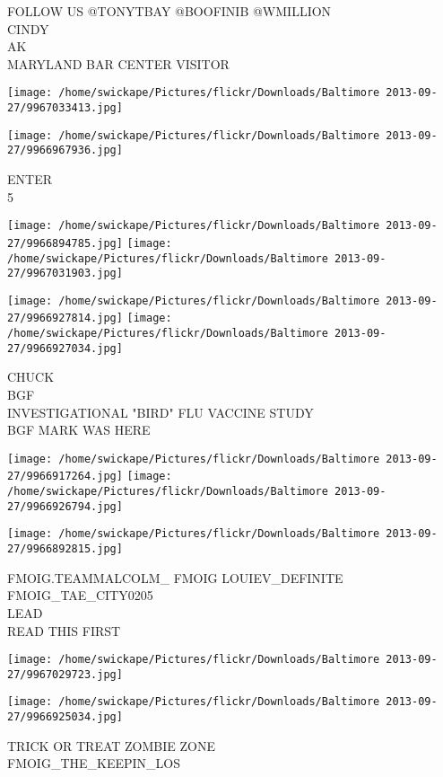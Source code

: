 \documentclass[10pt,letterpaper]{article}
\begin{document}
FOLLOW US @TONYTBAY @BOOFINIB @WMILLION\\
CINDY\\
AK\\
MARYLAND BAR CENTER VISITOR
\pagebreak

\texttt{[image: /home/swickape/Pictures/flickr/Downloads/Baltimore 2013-09-27/9967033413.jpg]}

\vspace{0.25in}
\texttt{[image: /home/swickape/Pictures/flickr/Downloads/Baltimore 2013-09-27/9966967936.jpg]}

ENTER\\
5
\pagebreak

\texttt{[image: /home/swickape/Pictures/flickr/Downloads/Baltimore 2013-09-27/9966894785.jpg]}
\texttt{[image: /home/swickape/Pictures/flickr/Downloads/Baltimore 2013-09-27/9967031903.jpg]}

\texttt{[image: /home/swickape/Pictures/flickr/Downloads/Baltimore 2013-09-27/9966927814.jpg]}
\texttt{[image: /home/swickape/Pictures/flickr/Downloads/Baltimore 2013-09-27/9966927034.jpg]}

CHUCK\\
BGF\\
INVESTIGATIONAL "BIRD" FLU VACCINE STUDY\\
BGF MARK WAS HERE
\pagebreak

\texttt{[image: /home/swickape/Pictures/flickr/Downloads/Baltimore 2013-09-27/9966917264.jpg]}
\texttt{[image: /home/swickape/Pictures/flickr/Downloads/Baltimore 2013-09-27/9966926794.jpg]}

\texttt{[image: /home/swickape/Pictures/flickr/Downloads/Baltimore 2013-09-27/9966892815.jpg]}

FMOIG.TEAMMALCOLM\_ FMOIG LOUIEV\_DEFINITE FMOIG\_TAE\_CITY0205\\
LEAD\\
READ THIS FIRST
\pagebreak

\texttt{[image: /home/swickape/Pictures/flickr/Downloads/Baltimore 2013-09-27/9967029723.jpg]}

\vspace{0.25in}
\texttt{[image: /home/swickape/Pictures/flickr/Downloads/Baltimore 2013-09-27/9966925034.jpg]}

TRICK OR TREAT ZOMBIE ZONE\\
FMOIG\_THE\_KEEPIN\_LOS
\pagebreak
\end{document}
